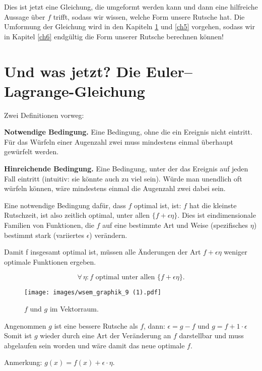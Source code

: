 Dies ist jetzt eine Gleichung, die umgeformt werden kann und dann eine hilfreiche Aussage über $f$ trifft, sodass wir wissen, welche Form unsere Rutsche hat. 
Die Umformung der Gleichung wird in den Kapiteln \ref{ch4} und \ref{ch5} vorgehen, sodass wir in Kapitel \ref{ch6} endgültig die Form unserer Rutsche berechnen können!

\newpage

\chapter{Und was jetzt? Die Euler--Lagrange-Gleichung}\label{ch4}

Zwei Definitionen vorweg:

\textbf{Notwendige Bedingung.} Eine Bedingung, ohne die ein Ereignis nicht eintritt. 
Für das Würfeln einer Augenzahl zwei muss mindestens einmal überhaupt gewürfelt werden.

\textbf{Hinreichende Bedingung.} Eine Bedingung, unter der das Ereignis auf jeden Fall eintritt (intuitiv: sie könnte auch zu viel sein). 
Würde man unendlich oft würfeln können, wäre mindestens einmal die Augenzahl zwei dabei sein.

Eine notwendige Bedingung dafür, dass $f$ optimal ist, ist:
$f$ hat die kleinste Rutschzeit, ist also zeitlich optimal, unter allen $\{f+\epsilon \eta\}$. 
Dies ist eindimensionale Familien von Funktionen, die $f$ auf eine bestimmte Art und Weise (spezifisches $\eta$) bestimmt stark (variiertes $\epsilon$) verändern.

Damit f insgesamt optimal ist, müssen alle Änderungen der Art $f+\epsilon \eta$ weniger optimale Funktionen ergeben.

\begin{equation}
\forall \, \eta: f \text{ optimal unter allen } \{f+\epsilon \eta\}.
\end{equation}

\begin{figure}[h]
 \centering
 \texttt{[image: images/wsem\_graphik\_9 (1).pdf]} 
 \caption[Subtraktion im Vektorraum. TikZ - eigene Arbeit.]{$f$ und $g$ im Vektorraum.}
 \label{fig:f+e=g} 
\end{figure}

Angenommen $g$ ist eine bessere Rutsche als $f$, dann:
$\epsilon=g-f$ und $g= f+1 \cdot \epsilon$
Somit ist $g$ wieder durch eine Art der Veränderung an $f$ darstellbar und muss abgelaufen sein worden und wäre damit das neue optimale $f$.

Anmerkung: $g(x)=f(x)+ \epsilon \cdot \eta$.

